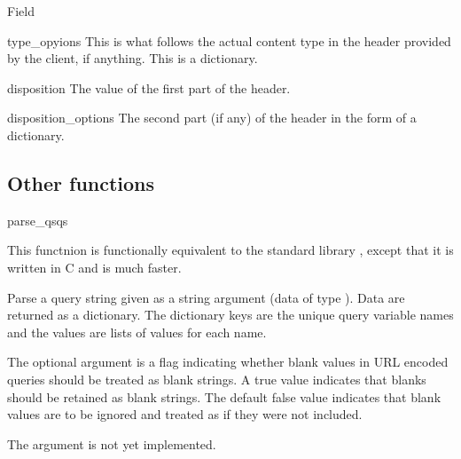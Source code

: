 \begin{classdesc}{Field}{}
  \begin{memberdesc}{type_opyions}
    This is what follows the actual content type in the 
    header provided by the client, if anything. This is a dictionary.
  \end{memberdesc}

  \begin{memberdesc}{disposition}
    The value of the first part of the  header.
  \end{memberdesc}

  \begin{memberdesc}{disposition_options}
    The second part (if any) of the  header in
    the form of a dictionary.
  \end{memberdesc}

  \begin{seealso}
  \end{seealso}
\end{classdesc}

\subsection{Other functions\label{pyapi-util-funcs}}

\begin{funcdesc}{parse_qs}{qs}

  This functnion is functionally equivalent to the standard library
   , except that it is written in C and is
  much faster. 

  Parse a query string given as a string argument (data of type
  ).  Data are
  returned as a dictionary.  The dictionary keys are the unique query
  variable names and the values are lists of values for each name.

  The optional argument  is a flag indicating
  whether blank values in URL encoded queries should be treated as blank
  strings.  A true value indicates that blanks should be retained as
  blank strings.  The default false value indicates that blank values
  are to be ignored and treated as if they were not included.

  \begin{notice}
    The  argument is not yet implemented.
  \end{notice}

\end{funcdesc}


